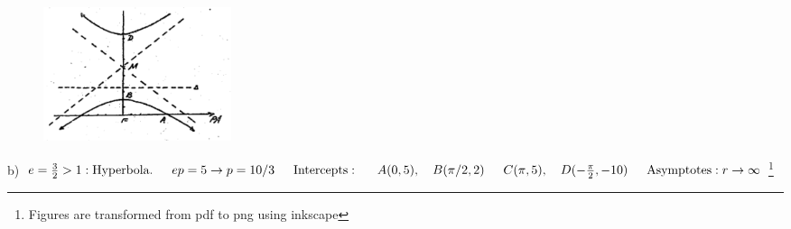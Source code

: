 \documentclass[11pt]{amsbook}
\begin{document}
\begin{figure}
	\vspace{-1.0cm}
	\includegraphics[width=5.5cm]{images/b1p2-314-fig02}
\end{figure}

b)\ $e = \frac{3}{2} > 1: \text{Hyperbola}.\\
\indent ep = 5 \rightarrow p = 10/3\\
\indent \text{Intercepts}:\\
\indent A(0, 5),\quad B(\pi/2, 2)\\
\indent C(\pi, 5),\quad D(-\frac{\pi}{2}, -10)\\
\indent \text{Asymptotes}: r \rightarrow \infty$
\footnote{Figures are transformed from pdf to png using inkscape}
\end{document}
